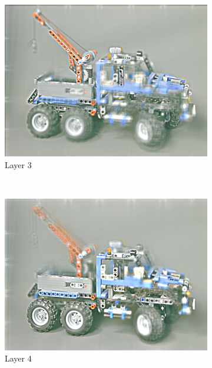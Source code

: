 \documentclass[11pt,a4paper,titlepage]{article}
\begin{document}
\begin{figure}
\begin{subfigure}[t]{0.31\textwidth}
		\includegraphics[width=\textwidth]{results/tiles_legotruck_6x6x480x640_480x640x5_tiling_4x6x200x200_overlap_0.5/3.png}
		\caption{Layer 3}
	\end{subfigure}%
	\\
	\begin{subfigure}[t]{0.31\textwidth}
		\includegraphics[width=\textwidth]{results/tiles_legotruck_6x6x480x640_480x640x5_tiling_4x6x200x200_overlap_0.5/4.png}
		\caption{Layer 4}
	\end{subfigure}%
	~
	\begin{subfigure}[t]{0.31\textwidth}

\end{subfigure}
\end{figure}
\end{document}
